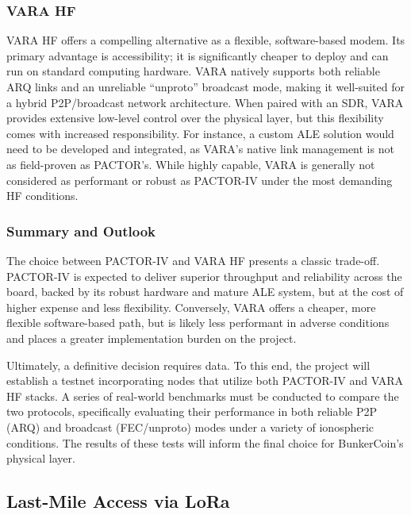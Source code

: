 \documentclass{article}
\begin{document}
\subsubsection{VARA HF}

VARA HF offers a compelling alternative as a flexible, software-based modem. Its primary advantage is accessibility; it is significantly cheaper to deploy and can run on standard computing hardware. VARA natively supports both reliable ARQ links and an unreliable ``unproto'' broadcast mode, making it well-suited for a hybrid P2P/broadcast network architecture. When paired with an SDR, VARA provides extensive low-level control over the physical layer, but this flexibility comes with increased responsibility. For instance, a custom ALE solution would need to be developed and integrated, as VARA's native link management is not as field-proven as PACTOR's. While highly capable, VARA is generally not considered as performant or robust as PACTOR-IV under the most demanding HF conditions.

\subsubsection{Summary and Outlook}
\label{sec:phys_summary}

The choice between PACTOR-IV and VARA HF presents a classic trade-off. PACTOR-IV is expected to deliver superior throughput and reliability across the board, backed by its robust hardware and mature ALE system, but at the cost of higher expense and less flexibility. Conversely, VARA offers a cheaper, more flexible software-based path, but is likely less performant in adverse conditions and places a greater implementation burden on the project.

Ultimately, a definitive decision requires data. To this end, the project will establish a testnet incorporating nodes that utilize both PACTOR-IV and VARA HF stacks. A series of real-world benchmarks must be conducted to compare the two protocols, specifically evaluating their performance in both reliable P2P (ARQ) and broadcast (FEC/unproto) modes under a variety of ionospheric conditions. The results of these tests will inform the final choice for BunkerCoin's physical layer.

\subsection{Last-Mile Access via LoRa}
\label{sec:lora}
\end{document}
